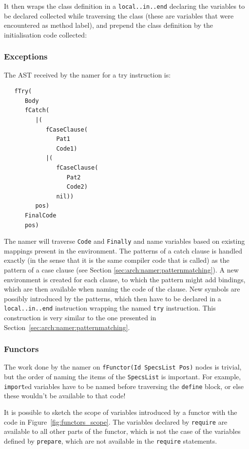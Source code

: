 \documentclass[a4paper]{memoir}
\begin{document}
It then wraps the class definition in a \lstinline!local..in..end! declaring the
variables to be declared collected while traversing the class (these are
variables that were encountered as method label), and prepend the class
definition by the initialisation code collected:


\subsubsection{Exceptions}\label{sec:arch:namer:exceptions}
The AST received by the namer for a try instruction is:
\begin{lstlisting}
   fTry(
      Body
      fCatch(
         |(
            fCaseClause(
               Pat1
               Code1)
            |(
               fCaseClause(
                  Pat2
                  Code2)
               nil))
         pos)
      FinalCode
      pos)
\end{lstlisting}

The namer will traverse \lstinline!Code! and \lstinline!Finally! and name variables based on existing
mappings present in the environment. The patterns of a catch clause is
handled exactly (in the sense that it is the same compiler code that is called)
as the pattern of a case clause (see Section \ref{sec:arch:namer:patternmatching}).
A new environment is created for each clause, to which the pattern might add
bindings, which are then available when naming the code of the clause.
New symbols are possibly introduced by the patterns, which then have to be
declared in a \lstinline!local..in..end! instruction wrapping the named
\lstinline!try!  instruction. This construction is very similar to the one
presented in Section~\ref{sec:arch:namer:patternmatching}.

\subsubsection{Functors}\label{sec:arch:namer:functors}
The work done by the namer on \lstinline!fFunctor(Id SpecsList Pos)! nodes is trivial, but the
order of naming the items of the \lstinline!SpecsList! is important. For
example, \lstinline!import!ed variables have to be named before traversing the
\lstinline!define! block, or else these wouldn't be available to that code!

It is possible to sketch the scope of variables introduced by a functor with the code in
Figure~\ref{fig:functors_scope}. The variables declared by \lstinline!require!
are available to all other parts of the functor, which is not the case of the
variables defined by \lstinline!prepare!, which are not available in the
\lstinline!require! statements. 
\end{document}
